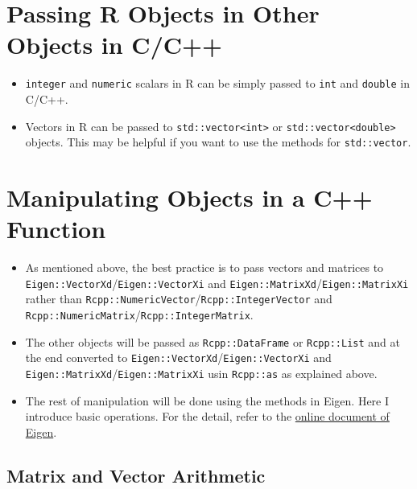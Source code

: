 \documentclass[
]{book}
\providecommand{\tightlist}{%
  \setlength{\itemsep}{0pt}\setlength{\parskip}{0pt}}
\begin{document}
\hypertarget{passing-r-objects-in-other-objects-in-cc}{%
\section{Passing R Objects in Other Objects in C/C++}\label{passing-r-objects-in-other-objects-in-cc}}

\begin{itemize}
\tightlist
\item
  \texttt{integer} and \texttt{numeric} scalars in R can be simply passed to \texttt{int} and \texttt{double} in C/C++.
\item
  Vectors in R can be passed to \texttt{std::vector\textless{}int\textgreater{}} or \texttt{std::vector\textless{}double\textgreater{}} objects. This may be helpful if you want to use the methods for \texttt{std::vector}.
\end{itemize}

\hypertarget{manipulating-objects-in-a-c-function}{%
\section{Manipulating Objects in a C++ Function}\label{manipulating-objects-in-a-c-function}}

\begin{itemize}
\tightlist
\item
  As mentioned above, the best practice is to pass vectors and matrices to \texttt{Eigen::VectorXd}/\texttt{Eigen::VectorXi} and \texttt{Eigen::MatrixXd}/\texttt{Eigen::MatrixXi} rather than \texttt{Rcpp::NumericVector}/\texttt{Rcpp::IntegerVector} and \texttt{Rcpp::NumericMatrix}/\texttt{Rcpp::IntegerMatrix}.
\item
  The other objects will be passed as \texttt{Rcpp::DataFrame} or \texttt{Rcpp::List} and at the end converted to \texttt{Eigen::VectorXd}/\texttt{Eigen::VectorXi} and \texttt{Eigen::MatrixXd}/\texttt{Eigen::MatrixXi} usin \texttt{Rcpp::as} as explained above.
\item
  The rest of manipulation will be done using the methods in Eigen. Here I introduce basic operations. For the detail, refer to the \href{https://eigen.tuxfamily.org/dox/GettingStarted.html}{online document of Eigen}.
\end{itemize}

\hypertarget{matrix-and-vector-arithmetic}{%
\subsection{Matrix and Vector Arithmetic}\label{matrix-and-vector-arithmetic}}
\end{document}
